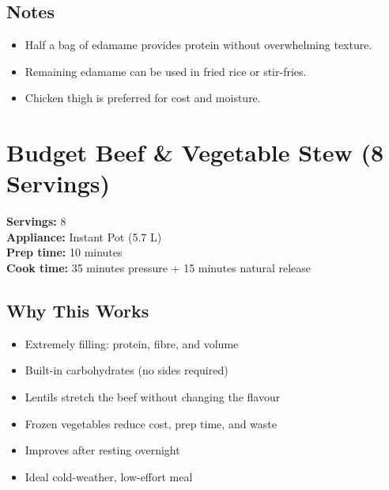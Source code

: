 \documentclass[11pt,a4paper]{article}
\begin{document}
\vspace{0.5em}

\subsection*{Notes}
\begin{itemize}
    \item Half a bag of edamame provides protein without overwhelming texture.
    \item Remaining edamame can be used in fried rice or stir-fries.
    \item Chicken thigh is preferred for cost and moisture.
\end{itemize}

\section*{Budget Beef \& Vegetable Stew (8 Servings)}

\textbf{Servings:} 8 \\
\textbf{Appliance:} Instant Pot (5.7 L) \\
\textbf{Prep time:} 10 minutes \\
\textbf{Cook time:} 35 minutes pressure + 15 minutes natural release

\vspace{0.5em}

\subsection*{Why This Works}
\begin{itemize}
    \item Extremely filling: protein, fibre, and volume
    \item Built-in carbohydrates (no sides required)
    \item Lentils stretch the beef without changing the flavour
    \item Frozen vegetables reduce cost, prep time, and waste
    \item Improves after resting overnight
    \item Ideal cold-weather, low-effort meal
\end{itemize}

\vspace{0.5em}
\end{document}
